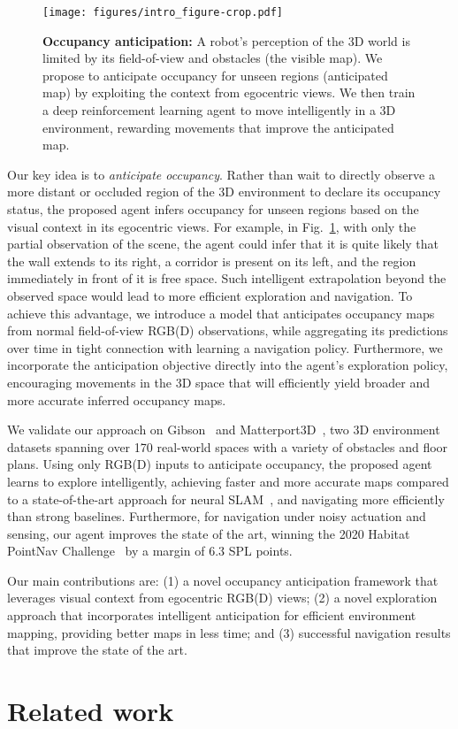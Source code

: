 \documentclass[runningheads]{llncs}
\begin{document}
\begin{figure}[t]
    \centering
    \texttt{[image: figures/intro\_figure-crop.pdf]}
    \caption{\small\textbf{Occupancy anticipation:} A robot's perception of the 3D world is limited by its field-of-view and obstacles (the visible map). We propose to anticipate occupancy for unseen regions (anticipated map) by exploiting the context from egocentric views.  We then train a deep reinforcement learning agent to move intelligently in a 3D environment, rewarding movements that improve the anticipated map.}
    \label{fig:intro_figure}
\end{figure}


Our key idea is to \emph{anticipate occupancy}. 
Rather than wait to directly observe a more distant or occluded region of the 3D environment to declare its occupancy status, the proposed agent infers occupancy for unseen regions based on the visual context in its egocentric views. For example, in Fig.~\ref{fig:intro_figure}, with only the partial observation of the scene, the agent could infer that it is quite likely that the wall extends to its right, a corridor is present on its left, and the region immediately in front of it is free space. Such intelligent extrapolation beyond the observed space would lead to more efficient exploration and navigation. To achieve this advantage, we introduce a model that anticipates occupancy maps from normal field-of-view RGB(D) observations, while aggregating its predictions over time in tight connection with learning a navigation policy. Furthermore, we incorporate the anticipation objective directly into the agent's exploration policy, encouraging movements in the 3D space that will efficiently yield broader and more accurate inferred occupancy maps.


We validate our approach on Gibson~\cite{xia2018gibson} and Matterport3D~\cite{chang2017matterport}, two 3D environment datasets spanning over 170 real-world spaces with a variety of obstacles and floor plans. Using only RGB(D) inputs to anticipate occupancy, the proposed agent learns to explore intelligently, achieving faster and more accurate maps compared to a state-of-the-art approach for neural SLAM~\cite{chaplot2020learning}, and navigating more efficiently than strong baselines.
Furthermore, for navigation under noisy actuation and sensing, our agent improves the state of the art, winning the 2020 Habitat PointNav Challenge~\cite{habitat-challenge} by a margin of 6.3 SPL points.


Our main contributions are: (1) a novel occupancy anticipation framework that leverages visual context from egocentric RGB(D) views; (2) a novel exploration approach that incorporates intelligent anticipation for efficient environment mapping, providing better maps in less time; and (3) successful navigation results that improve the state of the art. \section{Related work}
\end{document}
